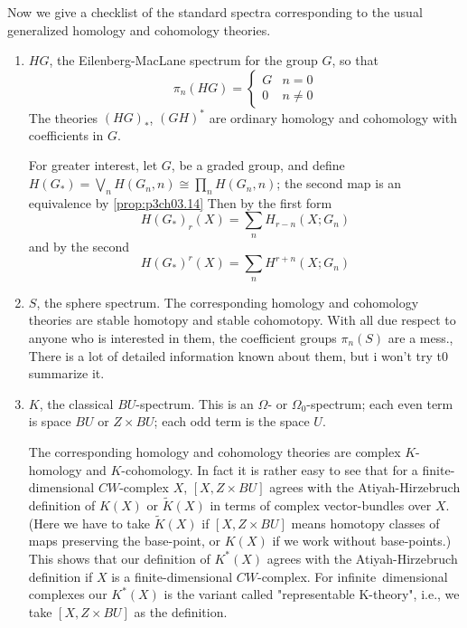 \documentclass[../main]{subfiles}
\begin{document}
Now we give a checklist of the standard spectra corresponding to the usual generalized homology and cohomology theories.
\begin{enumerate}
    \item $HG$, the Eilenberg-MacLane spectrum for the group $G$, so that
    \[\pi_n(HG) = 
    \begin{cases}
    G &n=0 \\
    0 &n\neq 0
    \end{cases}\]
    The theories $(HG)_\ast$, $(GH)^\ast$ are ordinary homology and cohomology with coefficients in $G$.
    
    For greater interest, let $G$, be a graded group, and define $H(G_\ast)=\bigvee_n H(G_n, n)\cong \prod_n H(G_n, n)$; the second map is an equivalence by \ref{prop:p3ch03.14} Then by the first form
    \[H(G_\ast)_r(X)=\sum_n H_{r-n}(X;G_n)\]
    and by the second
    \[H(G_\ast)^r(X)=\sum_n H^{r+n}(X;G_n)\]
    \item $S$, the sphere spectrum. The corresponding homology and cohomology theories are stable homotopy and stable cohomotopy. With all due respect to anyone who is interested in them, the coefficient groups $\pi_n(S)$ are a mess., There is a lot of detailed information known about them, but i won't try t0 summarize it.
    \item $K$, the classical $BU$-spectrum. This is an $\Omega$- or $\Omega_0$-spectrum; each even term is space $BU$ or $Z\times BU$; each odd term is the space $U$.
    
    The corresponding homology and cohomology theories are complex $K$-homology and $K$-cohomology. In fact it is rather easy to see that for a finite-dimensional $CW$-complex $X$, $[X, Z\times BU]$ agrees with the Atiyah-Hirzebruch definition of $K(X)$ or $\widetilde{K}(X)$ in terms of complex vector-bundles over $X$. (Here we have to take $\widetilde{K}(X)$ if $[X, Z\times BU]$ means homotopy classes of maps preserving the base-point, or $K(X)$ if we work without base-points.) This shows that our definition of $K^\ast(X)$ agrees with the Atiyah-Hirzebruch definition if $X$ is a finite-dimensional $CW$-complex. For infinite~dimensional complexes our $K^\ast(X)$ is the variant called "representable K-theory", i.e., we take $[X,Z\times BU]$ as the definition. 
    

\end{enumerate}
\end{document}
